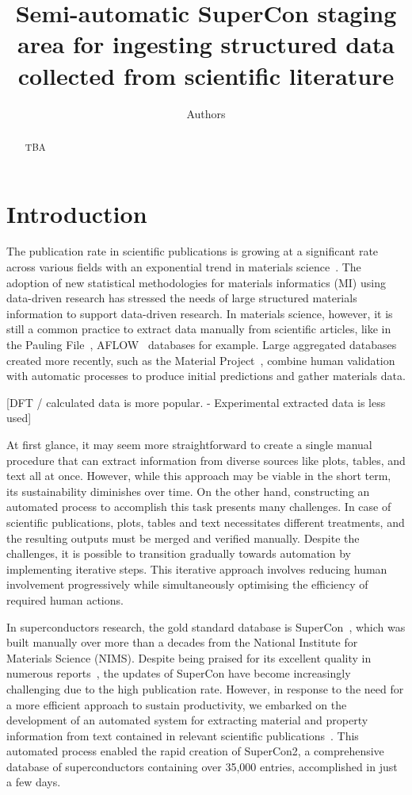 \documentclass{article}
\title{Semi-automatic SuperCon staging area for ingesting structured data collected from scientific literature}
\author{Authors}
\begin{document}
\maketitle

\begin{abstract}
    TBA
\end{abstract}

\section{Introduction}
The publication rate in scientific publications is growing at a significant rate across various fields with an exponential trend in materials science~\cite{Pratheepan_2019}. 
The adoption of new statistical methodologies for materials informatics (MI) using data-driven research has stressed the needs of large structured materials information to support data-driven research. 
In materials science, however, it is still a common practice to extract data manually from scientific articles, like in the Pauling File~\cite{Blokhin2018ThePF_paulingFile}, AFLOW~\cite{aflowcurtarolo2012aflow} databases for example. 
Large aggregated databases created more recently, such as the Material Project~\cite{materialsprojectJain2013}, combine human validation with automatic processes to produce initial predictions and gather materials data. 

[DFT / calculated data is more popular. - Experimental extracted data is less used]

At first glance, it may seem more straightforward to create a single manual procedure that can extract information from diverse sources like plots, tables, and text all at once. However, while this approach may be viable in the short term, its sustainability diminishes over time. 
On the other hand, constructing an automated process to accomplish this task presents many challenges. In case of scientific publications, plots, tables and text necessitates different treatments, and the resulting outputs must be merged and verified manually. Despite the challenges, it is possible to transition gradually towards automation by implementing iterative steps. This iterative approach involves reducing human involvement progressively while simultaneously optimising the efficiency of required human actions. 

In superconductors research, the gold standard database is SuperCon~\cite{SuperCon}, which was built manually over more than a decades from the National Institute for Materials Science (NIMS). 
Despite being praised for its excellent quality in numerous reports~\cite{roter2020predicting, stanev_machine_2017, tran2022machine, konno2021deep}, the updates of SuperCon have become increasingly challenging due to the high publication rate. However, in response to the need for a more efficient approach to sustain productivity, we embarked on the development of an automated system for extracting material and property information from text contained in relevant scientific publications~\cite{doi:10.1080/27660400.2022.2153633}. This automated process enabled the rapid creation of SuperCon2, a comprehensive database of superconductors containing over 35,000 entries, accomplished in just a few days. 
\end{document}
